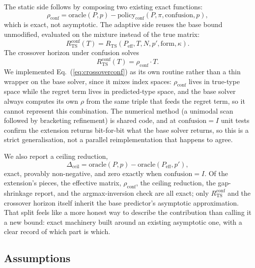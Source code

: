 \documentclass[conference]{IEEEtran}
\begin{document}
The static side follows by composing two existing exact functions:
\begin{equation}
\rho_{\mathrm{conf}} = \mathrm{oracle}(P,p) - \mathrm{policy}_{\mathrm{conf}}(P,\pi,\mathrm{confusion},p), \label{eq:rhoconf}
\end{equation}
which is exact, not asymptotic. The adaptive side reuses the base bound
unmodified, evaluated on the mixture instead of the true matrix:
\begin{equation}
R^{\mathrm{conf}}_{\mathrm{TS}}(T) = R_{\mathrm{TS}}(P_{\mathrm{eff}}, T, N, p', \mathrm{form}, \kappa). \label{eq:rtsconf}
\end{equation}
The crossover horizon under confusion solves
\begin{equation}
R^{\mathrm{conf}}_{\mathrm{TS}}(T) = \rho_{\mathrm{conf}} \cdot T. \label{eq:crossoverconf}
\end{equation}
We implemented Eq.~(\ref{eq:crossoverconf}) as its own routine rather
than a thin wrapper on the base solver, since it mixes index spaces:
$\rho_{\mathrm{conf}}$ lives in true-type space while the regret term
lives in predicted-type space, and the base solver always computes its
own $\rho$ from the same triple that feeds the regret term, so it cannot
represent this combination. The numerical method (a unimodal scan
followed by bracketing refinement) is shared code, and at
$\mathrm{confusion} = I$ unit tests confirm the extension returns
bit-for-bit what the base solver returns, so this is a strict
generalisation, not a parallel reimplementation that happens to agree.

We also report a ceiling reduction,
\begin{equation}
\Delta_{\mathrm{ceil}} = \mathrm{oracle}(P,p) - \mathrm{oracle}(P_{\mathrm{eff}}, p'), \label{eq:ceiling}
\end{equation}
exact, provably non-negative, and zero exactly when $\mathrm{confusion} =
I$. Of the extension's pieces, the effective matrix, $\rho_{\mathrm{conf}}$,
the ceiling reduction, the gap-shrinkage report, and the argmax-inversion
check are all exact; only $R^{\mathrm{conf}}_{\mathrm{TS}}$ and the
crossover horizon itself inherit the base predictor's asymptotic
approximation. That split feels like a more honest way to describe the
contribution than calling it a new bound: exact machinery built around an
existing asymptotic one, with a clear record of which part is which.

\subsection{Assumptions}
\end{document}

